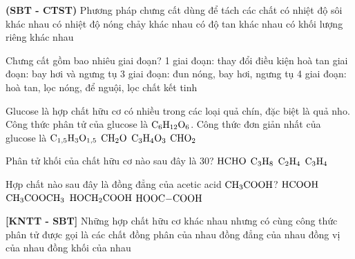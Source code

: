 \documentclass[12pt,a4paper]{article}
\begin{document}
\begin{ex}
\textbf{(SBT - CTST)} Phương pháp chưng cất dùng để tách các chất
\choice
{\True có nhiệt độ sôi khác nhau}
{có nhiệt độ nóng chảy khác nhau}
{có độ tan khác nhau}
{có khối lượng riêng khác nhau}

\end{ex}

\begin{ex}
Chưng cất gồm bao nhiêu giai đoạn?
\choice
{1 giai đoạn: thay đổi điều kiện hoà tan}
{ giai đoạn: bay hơi và ngưng tụ}
{3 giai đoạn: đun nóng, bay hơi, ngưng tụ}
{4 giai đoạn: hoà tan, lọc nóng, để nguội, lọc chất kết tinh}

\end{ex}

\begin{ex}
Glucose là hợp chất hữu cơ có nhiều trong các loại quả chín, đặc biệt là quả nho. Công thức phân tử của glucose là $\ce{C6H12O6}$. Công thức đơn giản nhất của glucose là
\choice
{$\ce{C_{1,5}H3O_{1,5}}$}
{\True $\ce{CH2O}$}
{$\ce{C3H4O3}$}
{$\ce{CHO2}$}

\end{ex}

\begin{ex}
Phân tử khối của chất hữu cơ nào sau đây là 30?
\choice
{\True $\ce{HCHO}$}
{$\ce{C3H8}$}
{$\ce{C2H4}$}
{$\ce{C3H4}$}

\end{ex}

\begin{ex}
Hợp chất nào sau đây là đồng đẳng của acetic acid $\ce{CH3COOH}$?
\choice
{\True $\ce{HCOOH}$}
{$\ce{CH3COOCH3}$}
{$\ce{HOCH2COOH}$}
{$\ce{HOOC-COOH}$}

\end{ex}

\begin{ex}
\textbf{[KNTT - SBT]} Những hợp chất hữu cơ khác nhau nhưng có cùng công thức phân tử được gọi là các chất
\choice
{\True đồng phân của nhau}
{đồng đẳng của nhau}
{đồng vị của nhau}
{đồng khối của nhau}

\end{ex}
\end{document}
